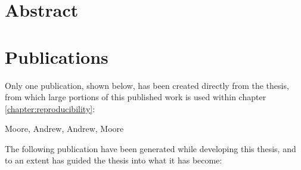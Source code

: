 \documentclass[twoside,11pt, a4paper]{report}
\newcommand*{\boldnames}{}
\begin{document}
\section*{\centering Abstract}



\clearpage


\clearpage

\section*{\centering Publications}
Only one publication, shown below, has been created directly from the thesis, from which large portions of this published work is used within chapter \ref{chapter:reproducibility}:\bigskip

\forcsvlist{\listadd\boldnames} %
  {{Moore, Andrew}, {Andrew, Moore}}
\noindent {}\vspace{24pt}

\noindent The following publication have been generated while developing this thesis, and to an extent has guided the thesis into what it has become:\bigskip

\noindent {}\bigskip

\noindent {}\bigskip

\noindent {}\bigskip

\noindent {}
\renewcommand*{\boldnames}{} %

\clearpage



\clearpage

\tableofcontents

\clearpage
\end{document}
